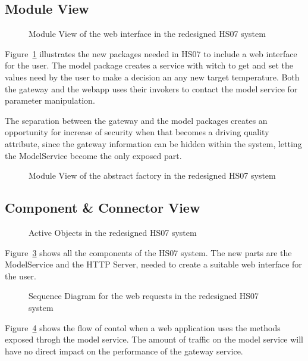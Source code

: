 \documentclass[a4paper,10pt]{article}
\begin{document}
\clearpage

\subsection{Module View}

\begin{figure}[!htb]
\centerline{}
\caption{Module View of the web interface in the redesigned HS07 system}
\label{fig:mv-model}
\end{figure}
Figure~\ref{fig:mv-model} illustrates the new packages needed in HS07 to include a web interface for the user. The model package creates a service with witch to get and set the values  need by the user to make a decision an any new target temperature. Both the gateway and the webapp uses their invokers to contact the model service for parameter manipulation.

The separation between the gateway and the model packages creates an opportunity for increase of security when that becomes a driving quality attribute, since the gateway information can be hidden within the system, letting the ModelService become the only exposed part.
\begin{figure}[!htb]
\centerline{}
\caption{Module View of the abstract factory in the redesigned HS07 system}
\label{fig:mv-factory}
\end{figure}

\clearpage

\subsection{Component \& Connector View}

\begin{figure}[!htb]
\centerline{}
\caption{Active Objects in the redesigned HS07 system}
\label{fig:activeobjects}
\end{figure}
Figure~\ref{fig:activeobjects} shows all the components of the HS07 system. The new parts are the ModelService and the HTTP Server, needed to create a suitable web interface for the user.
\clearpage


\begin{figure}[!htb]
\centerline{}
\caption{Sequence Diagram for the web requests in the redesigned HS07 system}
\label{fig:seq-stt}
\end{figure}
Figure~\ref{fig:seq-stt} shows the flow of contol when a web application uses the methods exposed throgh the model service. The amount of traffic on the model service will have no direct impact on the performance of the gateway service.
\end{document}
